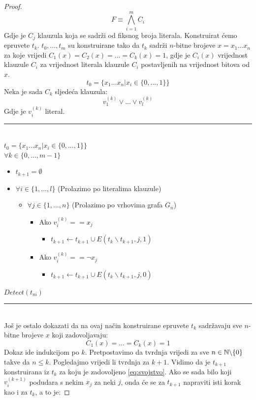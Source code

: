 \documentclass[12pt, a4paper]{book}
\begin{document}
\begin{spacing}{1.5}
\begin{proof}
\begin{equation}
\label{eq:knf}
F\equiv \bigwedge_{i=1}^m C_i
\end{equation} 
Gdje je $C_j$ klauzula koja se sadrži od fiksnog broja literala. Konstruirat ćemo epruvete $t_k$.
$t_0,...,t_m$ su konstruirane tako da $t_k$ sadrži $n$-bitne brojeve $x=x_1...x_n$ za koje vrijedi $C_1(x)=C_2(x)=...=C_k(x)=1$, gdje je $C_i(x)$ vrijednost klauzule $C_i$ za vrijednost literala klauzule $C_i$ postavljenih na vrijednost bitova od $x$.
\[t_0=\{x_1...x_n |x_i \in \{0,...,1\}\}\]
Neka je sada $C_{k}$ sljedeća klauzula:
\[v_1^{(k)} \vee ... \vee v_l^{(k)}\]
Gdje je $v_i^{(k)}$ literal. \\
\noindent\rule{8cm}{0.4pt}\\
$t_0=\{x_1...x_n |x_i \in \{0,...,1\}\}$\\
$\forall k \in \{0,...,m-1\}$	
\begin{itemize}
\item $t_{k+1}=\emptyset$
\item $\forall i \in \{1,...,l\}$ (Prolazimo po literalima klauzule)
\begin{itemize}
\item $ \forall	j \in \{1,...,n\}$ (Prolazimo po vrhovima grafa $G_n$)
	\begin{itemize}
		\item Ako $v_i ^{(k)}==x_j$
		\begin{itemize}
			\item  $t_{k+1} \leftarrow t_{k+1} \cup E(t_{k}\backslash t_{k+1},j,1)$
		\end{itemize}
		\item Ako $v_i^{(k)}==\neg x_j$
		\begin{itemize}
			\item $t_{k+1} \leftarrow t_{k+1} \cup E(t_{k} \backslash t_{k+1},j,0)$
		\end{itemize}
	\end{itemize}
\end{itemize}
\end{itemize}
$Detect(t_m)$\\
\noindent\rule{8cm}{0.4pt}\\
Još je ostalo dokazati da na ovaj način konstruirane epruvete $t_k$  sadržavaju sve $n$-bitne brojeve $x$ koji zadovoljavaju: \begin{equation}
\label{eq:svojstvo}
C_1(x)=...=C_k(x)=1
\end{equation}
Dokaz ide indukcijom po $k$. Pretpostavimo da tvrdnja vrijedi za sve $n \in \mathbb{N} \backslash \{0\}$ takve da $n \leq k$. Pogledajmo vrijedi li tvrdnja za $k+1$. Vidimo da je $t_{k+1}$ konstruirana iz $t_k$ za koju je zadovoljeno \ref{eq:svojstvo}. Ako se sada bilo koji $v_i ^{(k+1)}$ podudara s nekim $x_j$ za neki $j$, onda će se za $t_{k+1}$ napraviti isti korak kao i za $t_k$, a to je:

\end{proof}
\end{spacing}
\end{document}
